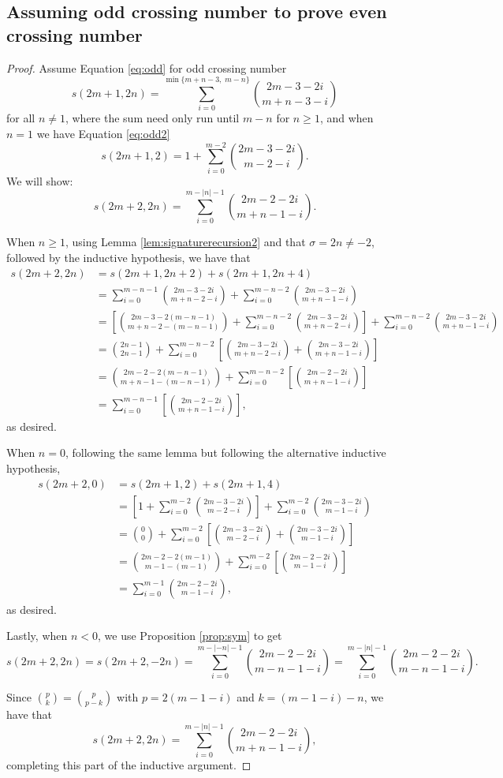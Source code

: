 \documentclass[11pt]{amsart}
\theoremstyle{definition}
\theoremstyle{remark}
\numberwithin{equation}{section}
\begin{document}
\subsection{Assuming odd crossing number to prove even crossing number}
\begin{proof}
Assume Equation \eqref{eq:odd} for odd crossing number
\[ s(2m+1,2n)=\sum_{i=0}^{\min\{m+n-3,\; m-n \}}{2m-3-2i\choose m+n-3-i}\] for all $n \neq 1$, where the sum need only run until $m-n$ for $n\geq 1$, and when $n=1$ we have Equation \eqref{eq:odd2}
\[s(2m+1,2)=1+\sum_{i=0}^{m-2}{2m-3-2i\choose m-2-i}.\]
We will show:
\[  s(2m+2,2n)=\displaystyle\sum_{i=0}^{m-|n|-1}{2m-2-2i\choose m+n-1-i}.  \]

When $n\geq 1$, using Lemma \ref{lem:signaturerecursion2} 
and that $\sigma=2n\ne-2$, followed by the inductive hypothesis, we have that 
\begin{align*}
s(2m+2,2n) & =s(2m+1,2n+2)+s(2m+1,2n+4) \\
 & =\sum_{i=0}^{m-n-1}{2m-3-2i\choose m+n-2-i} +\sum_{i=0}^{m-n-2}{2m-3-2i\choose m+n-1-i} \\
 &= \left[ {2m-3-2(m-n-1)\choose m+n-2-(m-n-1)} + \sum_{i=0}^{m-n-2}{2m-3-2i\choose m+n-2-i} \right] +\sum_{i=0}^{m-n-2}{2m-3-2i\choose m+n-1-i} \\
 &=  {2n-1\choose 2n-1} + \sum_{i=0}^{m-n-2} \left[{2m-3-2i\choose m+n-2-i} + {2m-3-2i\choose m+n-1-i} \right] \\
 &=  {2m-2-2(m-n-1)\choose m+n-1-(m-n-1)} + \sum_{i=0}^{m-n-2} \left[{2m-2-2i\choose m+n-1-i}  \right] \\
 & =  \sum_{i=0}^{m-n-1} \left[{2m-2-2i\choose m+n-1-i}  \right],
\end{align*}
as desired.

When $n=0$, following the same lemma but following the alternative inductive hypothesis,
\begin{align*}
   s(2m+2,0) & = s(2m+1,2)+s(2m+1,4) \\
   & = \left[ 1+\sum_{i=0}^{m-2}{2m-3-2i\choose m-2-i}\right] +\sum_{i=0}^{m-2}{2m-3-2i\choose m-1-i} \\
  & ={0 \choose 0}+\sum_{i=0}^{m-2} \left[{2m-3-2i\choose m-2-i} +{2m-3-2i\choose m-1-i} \right] \\ 
  & = {2m-2-2(m-1) \choose m-1-(m-1) }+\sum_{i=0}^{m-2} \left[{2m-2-2i\choose m-1-i} \right] \\ 
  & = \sum_{i=0}^{m-1} {2m-2-2i\choose m-1-i},
\end{align*}
as desired.

Lastly, when $n<0$, we use Proposition \ref{prop:sym} to get
\[
s(2m+2,2n) = s(2m+2,-2n) = \sum_{i=0}^{m-|-n|-1} {2m-2-2i \choose m-n-1-i} = \sum_{i=0}^{m-|n|-1} {2m-2-2i \choose m-n-1-i}.
\]

Since ${p \choose k} = {p \choose p-k}$ with $p=2(m-1-i)$ and $k=(m-1-i)-n$, we have that 
\[
s(2m+2,2n)= \sum_{i=0}^{m-|n|-1} {2m-2-2i \choose m+n-1-i},
\]
completing this part of the inductive argument.
\end{proof} 
\end{document}
